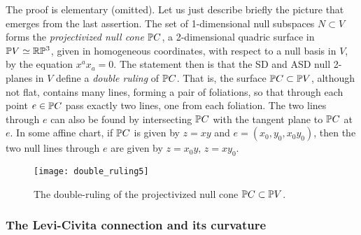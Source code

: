 The proof is elementary (omitted). Let us just describe briefly the  picture that emerges from   the last assertion. The set of 1-dimensional null subspaces $N\subset V$  forms  the {\em projectivized null cone}  $\P C$,  a 2-dimensional quadric surface in $\P V\simeq\RP^3$, given in homogeneous coordinates, with respect to a null basis in $V$, by the equation $x^ax_a=0$. 
The statement then is that the SD and ASD null 2-planes in 
$V$ define a  {\em double ruling} of $\P C$. That is, the surface $\P C\subset \P V$, although not flat, contains many lines, forming a pair of foliations, so that through each point $e\in\P C$ pass exactly two lines, one from each foliation. The two lines through $e$ can also be found by intersecting $\P C$ with  the tangent plane to  $\P C$ at $e$. In some  affine chart, if $\P C$ is given by  $z=xy$ and  $e=(x_0,y_0, x_0y_0)$, then  the two null lines through $e$ are given by $z=x_0y$, $z=xy_0$. 
\begin{figure}[H]\centering
\texttt{[image: double\_ruling5]}
\caption{The double-ruling of the projectivized null cone  $\P C\subset \P V$.}
\end{figure}



\subsubsection{The Levi-Civita connection and its curvature}\label{LC}


